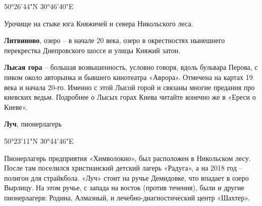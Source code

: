 50°26'44"N 30°46'40"E

Урочище на стыке юга Княжичей и севера Никольского леса.\\

\medskip

\textbf{Литвиново}, озеро – в начале 20 века, озеро в окрестностях нынешнего перекрестка Днепровского шоссе и улицы Княжий затон.\\

\medskip

\textbf{Лысая гора} – большая возвышенность, условно говоря, вдоль бульвара Перова, с пиком около авторынка и бывшего кинотеатра «Аврора». Отмечена на картах 19 века и начала 20-го. Именно с этой Лысой горой и связаны многие предания про киевских ведьм. Подробнее о Лысых горах Киева читайте конечно же в «Ереси о Киеве».\\

\medskip

\textbf{Луч}, пионерлагерь

50°23'11"N 30°44'46"E

Пионерлагерь предприятия «Химволокно», был расположен в Никольском лесу. После там поселился христианский детский лагерь «Радуга», а на 2018 год – полигон для страйкбола. «Луч» стоит на ручье Демидовке, что впадает в озеро Вырлицу. На этом ручье, с запада на восток (против течения), были и другие пионерлагеря: Родина, Алмазный, и лечебно-диагностический центр «Шахтер».
